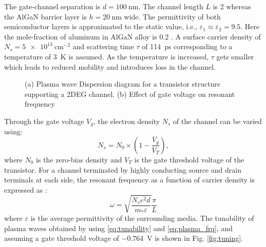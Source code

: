 \documentclass[10pt]{article}
\renewcommand{\^}{\hat}  %
\renewcommand{\O}{\omega}  %
\newcommand{\E}{\varepsilon}  %
\renewcommand{\^}{\hat}  %
\begin{document}
The gate-channel separation is $d = \SI{100}{\nm}$. The channel length $L$ is \SI{2}{\micm} whereas the AlGaN barrier layer is $h = \SI{20}{\nm}$ wide.
The permittivity of both semiconductor layers is approximated to the static value, i.e., $\E_1 \approx \E_2 = 9.5$. Here the mole-fraction of aluminum in AlGaN alloy is \SI{.2}{} \cite{Muravjov2010}. A surface carrier density of $N_s=\SI{5e13}{\cm^{-2}}$ and scattering time $\tau$ of \SI{114}{\ps} corresponding to a temperature of \SI{3}{\kelvin} is assumed. As the temperature is increased, $\tau$ gets smaller which leads to reduced mobility and introduces loss in the channel.
%
\begin{figure}[t!]
  \centering
      \hfil
  \caption{(a) Plasma wave Dispersion diagram for a transistor structure supporting a 2DEG channel. (b) Effect of gate voltage on resonant frequency}
  \label{fig:matlab_simulation}
\end{figure}
%
Through the gate voltage $V_g$, the electron density $N_s$ of the channel can be varied using:
%
\begin{equation}
  N_s = N_0 \times \left(1 - \frac{V_g}{V_T} \right),
  \label{eq:tunability}
\end{equation}
%
where $N_0$ is the zero-bias density and $V_T$ is the gate threshold voltage of the transistor. For a channel terminated by highly conducting source and drain terminals at each side, the resonant frequency as a function of carrier density is expressed as \cite{Popov2008}:
%
\begin{equation}
  \O = \sqrt{\frac{N_s e^2 d}{m_{\ast} \E}} \frac{\pi}{L}
  \label{eq:plasma_frq}
\end{equation}
%
where $\E$ is the average permittivity of the surrounding media. The tunability of plasma waves obtained by using \eqref{eq:tunability} and \eqref{eq:plasma_frq}, and assuming a gate threshold voltage of \SI{-.764}{\volt} is shown in Fig. \ref{fig:tuning}.
%
%
%
%
\end{document}
